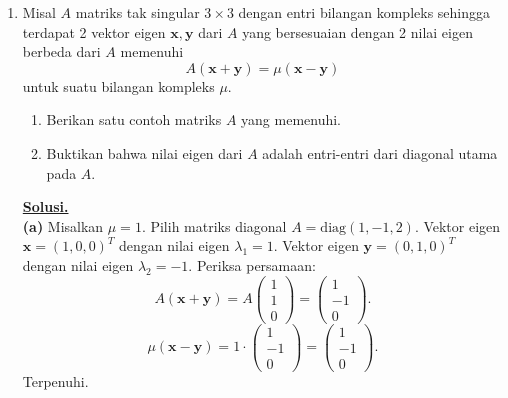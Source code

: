 \documentclass[12pt,twoside]{article}
\newenvironment{solution}
{
	\par\noindent\textbf{\underline{Solusi.}}\\
}
{
	\par
}
\begin{document}
\begin{enumerate}
  \item Misal $A$ matriks tak singular $3 \times 3$ dengan entri bilangan kompleks sehingga terdapat 2 vektor eigen $\mathbf{x},\mathbf{y}$ dari $A$ yang bersesuaian dengan 2 nilai eigen berbeda dari $A$ memenuhi
        \[
          A(\mathbf{x}+\mathbf{y}) = \mu (\mathbf{x}-\mathbf{y})
        \]
        untuk suatu bilangan kompleks $\mu$.
        \begin{enumerate}
          \item Berikan satu contoh matriks $A$ yang memenuhi.
          \item Buktikan bahwa nilai eigen dari $A$ adalah entri-entri dari diagonal utama pada $A$.
        \end{enumerate}
        \begin{solution}
          \textbf{(a)} Misalkan $\mu = 1$. Pilih matriks diagonal $A = \text{diag}(1, -1, 2)$.
          Vektor eigen $\mathbf{x} = (1, 0, 0)^T$ dengan nilai eigen $\lambda_1 = 1$.
          Vektor eigen $\mathbf{y} = (0, 1, 0)^T$ dengan nilai eigen $\lambda_2 = -1$.
          Periksa persamaan:
          \[ A(\mathbf{x}+\mathbf{y}) = A\begin{pmatrix} 1 \\ 1 \\ 0 \end{pmatrix} = \begin{pmatrix} 1 \\ -1 \\ 0 \end{pmatrix}. \]
          \[ \mu(\mathbf{x}-\mathbf{y}) = 1 \cdot \begin{pmatrix} 1 \\ -1 \\ 0 \end{pmatrix} = \begin{pmatrix} 1 \\ -1 \\ 0 \end{pmatrix}. \]
          Terpenuhi.


\end{solution}
\end{enumerate}
\end{document}
